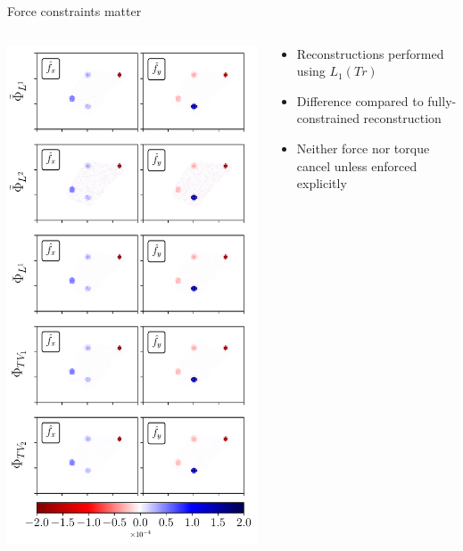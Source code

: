\documentclass[presentation,aspectratio=169]{beamer}
\begin{document}
\begin{frame}{Force constraints matter}
\centering
\begin{columns}
\begin{column}{0.6\textwidth}
\includegraphics[width=\textwidth]{figures/fig3}
\end{column}
\begin{column}{0.4\textwidth}
\begin{itemize}
\item Reconstructions performed using $L_1(Tr)$
\item Difference compared to fully-constrained reconstruction
\item Neither force nor torque cancel unless enforced explicitly
\end{itemize}
\end{column}
\end{columns}
\end{frame}
\end{document}
